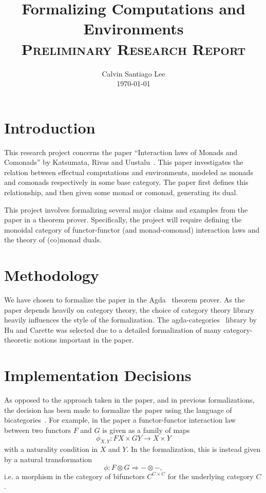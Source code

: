 \documentclass{amsart}
\title{Formalizing Computations and Environments \\ \normalfont\normalsize\textsc{Preliminary Research Report}}
\author{Calvin Santiago Lee\\\textup{\today}}
\theoremstyle{remark}
\begin{document}
\maketitle
\tableofcontents
\section{Introduction}

This research project concerns the paper ``Interaction laws of Monads and Comonads'' by Katsumata, Rivas and Uustalu~\cite{monads-comonads}. This paper investigates the relation between effectual computations  and environments, modeled as monads and comonads respectively in some base category. The paper first defines this relationship, and then given some monad or comonad, generating its dual.

This project involves formalizing several major claims and examples from the paper in a theorem prover. Specifically, the project will require defining the monoidal category of functor-functor (and monad-comonad) interaction laws and the theory of (co)monad duals.

\section{Methodology}
We have chosen to formalize the paper in the Agda~\cite{agda} theorem prover. As the paper depends heavily on category theory, the choice of category theory library heavily influences the style of the formalization. The agda-categories~\cite{agda:categories} library by Hu and Carette was selected due to a detailed formalization of many category-theoretic notions important in the paper.

\section{Implementation Decisions}\label{section:decisions}
As opposed to the approach taken in the paper, and in previous formalizations, the decision has been made to formalize the paper using the language of bicategories~\cite{nlab:bicategory}. For example, in the paper a functor-functor interaction law between two functors $F$ and $G$ is given as a family of maps 
\[\phi_{X,Y}\colon F X \times GY \to X \times Y\]
with a naturality condition in $X$ and $Y$.
In the formalization, this is instead given by a natural transformation \[\phi \colon F \otimes G \Rightarrow -\otimes -,\]
i.e. a morphism in the category of bifunctors \(C^{C\times C}\) for the underlying category $C$.
\end{document}
